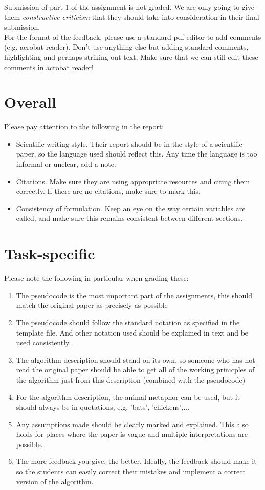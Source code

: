 \documentclass[runningheads]{llncs}
\begin{document}
Submission of part 1 of the assignment is not graded. We are only going to give them \textit{constructive criticism} that they should take into consideration in their final submission.\\
For the format of the feedback, please use a standard pdf editor to add comments (e.g. acrobat reader). Don't use anything else but adding standard comments, highlighting and perhaps striking out text. Make sure that we can still edit these comments in acrobat reader!

\section{Overall}
Please pay attention to the following in the report:
\begin{itemize}
    \item Scientific writing style. Their report should be in the style of a scientific paper, so the language used should reflect this. Any time the language is too informal or unclear, add a note.
    \item Citations. Make sure they are using appropriate resources and citing them correctly. If there are no citations, make sure to mark this.
    \item Consistency of formulation. Keep an eye on the way certain variables are called, and make sure this remains consistent between different sections.
\end{itemize}

\section{Task-specific}


Please note the following in particular when grading these:
\begin{enumerate}
\item The pseudocode is the most important part of the assignments, this should match the original paper as precisely as possible
\item The pseudocode should follow the standard notation as specified in the template file. And other notation used should be explained in text and be used consistently.
\item The algorithm description should stand on its own, so someone who has not read the original paper should be able to get all of the working prinicples of the algorithm just from this description (combined with the pseudocode)
\item For the algorithm description, the animal metaphor can be used, but it should always be in quotations, e.g. 'bats', 'chickens',...
\item Any assumptions made should be clearly marked and explained. This also holds for places where the paper is vague and multiple interpretations are possible.
\item The more feedback you give, the better. Ideally, the feedback should make it so the students can easily correct their mistakes and implement a correct version of the algorithm.
\end{enumerate}
\end{document}

